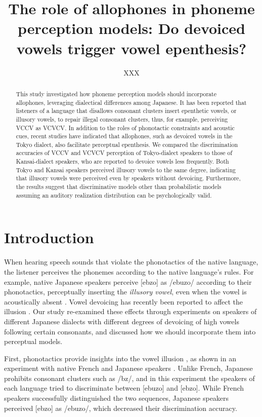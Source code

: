 \documentclass[a4paper,11pt,twocolumn]{article}
\title{The role of allophones in phoneme perception models: Do devoiced vowels trigger vowel epenthesis?}
\author{XXX}
\begin{document}
\maketitle

\begin{abstract}
This study investigated how phoneme perception models should incorporate allophones, leveraging dialectical differences among Japanese. It has been reported that listeners of a language that disallows consonant clusters insert epenthetic vowels, or illusory vowels, to repair illegal consonant clusters, thus, for example, perceiving VCCV as VCVCV. In addition to the roles of phonotactic constraints and acoustic cues, recent studies have indicated that allophones, such as devoiced vowels in the Tokyo dialect, also facilitate perceptual epenthesis. We compared the discrimination accuracies of VCCV and VCVCV perception of Tokyo-dialect speakers to those of Kansai-dialect speakers, who are reported to devoice vowels less frequently. Both Tokyo and Kansai speakers perceived illusory vowels to the same degree, indicating that illusory vowels were perceived even by speakers without devoicing. Furthermore, the results suggest that discriminative models other than probabilistic models assuming an auditory realization distribution can be psychologically valid.
\end{abstract}


\section{Introduction}

When hearing speech sounds that violate the phonotactics of the native language, the listener perceives the phonemes according to the native language's rules. For example, native Japanese speakers perceive [ebzo] as /ebuzo/ according to their phonotactics, perceptually inserting the \textit{illusory vowel}, even when the vowel is acoustically absent \cite{dupoux1999epentheticvi, dupoux2011illusory}. Vowel devoicing has recently been reported to affect the illusion \cite{kilpatrick2018japanese}. Our study re-examined these effects through experiments on speakers of different Japanese dialects with different degrees of devoicing of high vowels following certain consonants, and discussed how we should incorporate them into perceptual models.

First, phonotactics provide insights into the vowel illusion \cite{halle2014special, monahan2009not, mattingley2015influence}, as shown in an experiment with native French and Japanese speakers \cite{dupoux1999epentheticvi}. Unlike French, Japanese prohibits consonant clusters such as /bz/, and in this experiment the speakers of each language tried to discriminate between [ebuzo] and [ebzo]. While French speakers successfully distinguished the two sequences, Japanese speakers perceived [ebzo] as /ebuzo/, which decreased their discrimination accuracy.
\end{document}
